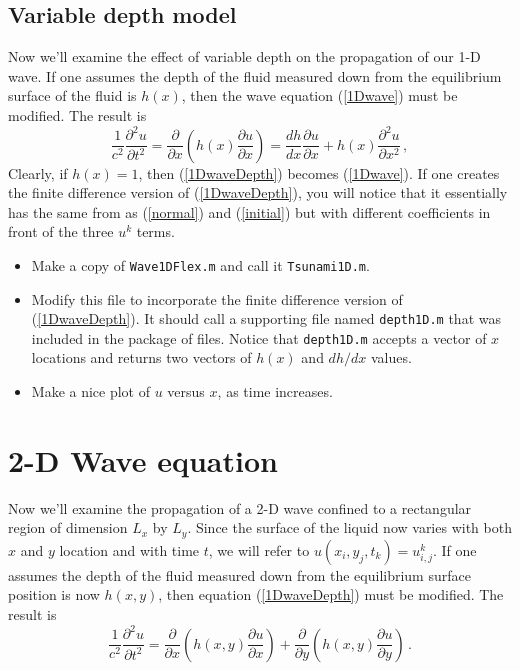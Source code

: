 \documentclass[11pt]{article}
\begin{document}
\subsection{Variable depth model}
Now we'll examine the effect of variable depth on the propagation
of our 1-D wave. If one assumes the depth of the fluid measured down from
the equilibrium surface of the fluid is $h(x)$, then the wave equation
(\ref{1Dwave}) must be modified. The result is
\begin{equation}
\frac{1}{c^2}\frac{\partial^2 u}{\partial t^2}
       = \frac{\partial}{\partial x} \left( h(x)
             \frac{\partial u}{\partial x} \right) 
       = \frac{dh}{dx} \frac{\partial u}{\partial x}
       + h(x) \frac{\partial^2 u}{\partial x^2} \,,
                                                      \label{1DwaveDepth}
\end{equation}
Clearly, if $h(x) = 1$, then (\ref{1DwaveDepth}) becomes (\ref{1Dwave}).
If one creates the finite difference version of (\ref{1DwaveDepth}),
you will notice that it essentially has the same from as
(\ref{normal}) and (\ref{initial}) but with different coefficients in front
of the three $u^k$ terms.

\begin{itemize}
\item Make a copy of {\tt Wave1DFlex.m} and call it {\tt Tsunami1D.m}.
\item Modify this file to incorporate the finite difference version
      of (\ref{1DwaveDepth}). It should call a supporting file named
      {\tt depth1D.m} that was included in the package of files. Notice
      that {\tt depth1D.m} accepts a vector of $x$ locations and returns
      two vectors of $h(x)$ and $dh/dx$ values.
\item Make a nice plot of $u$ versus $x$, as time increases.
\end{itemize}



\section{2-D Wave equation}
Now we'll examine the propagation
of a 2-D wave confined to a rectangular region of dimension
$L_x$ by $L_y$. Since the surface of the liquid now
varies with both $x$ and $y$ location and with time $t$,
we will refer to $u(x_i, y_j, t_k) = u_{i,j}^k$.
If one assumes the depth of the fluid measured down from
the equilibrium surface position is now $h(x,y)$, then equation
(\ref{1DwaveDepth}) must be modified. The result is
\begin{equation}
\frac{1}{c^2}\frac{\partial^2 u}{\partial t^2}
                    = \frac{\partial}{\partial x} \left( h(x,y)
                      \frac{\partial u}{\partial x} \right)
                    + \frac{\partial}{\partial y} \left( h(x,y)
                      \frac{\partial u}{\partial y} \right)
                                                  \,.    \label{2DwaveDepth}
\end{equation}
\end{document}
